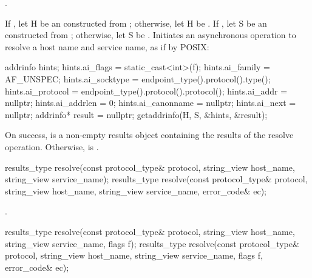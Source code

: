 \begin{itemdescr}
\pnum
\completionsig {}.

\pnum
\effects If , let H be an \ntbs constructed from ; otherwise, let H be . If , let S be an \ntbs constructed from ; otherwise, let S be . Initiates an asynchronous operation to resolve a host name and service name, as if by POSIX:
\begin{codeblock}
addrinfo hints;
hints.ai_flags = static_cast<int>(f);
hints.ai_family = AF_UNSPEC;
hints.ai_socktype = endpoint_type().protocol().type();
hints.ai_protocol = endpoint_type().protocol().protocol();
hints.ai_addr = nullptr;
hints.ai_addrlen = 0;
hints.ai_canonname = nullptr;
hints.ai_next = nullptr;
addrinfo* result = nullptr;
getaddrinfo(H, S, &hints, &result);
\end{codeblock}
 On success,  is a non-empty results object containing the results of the resolve operation. Otherwise,  is .
\end{itemdescr}

\begin{itemdecl}
results_type resolve(const protocol_type& protocol,
                     string_view host_name, string_view service_name);
results_type resolve(const protocol_type& protocol,
                     string_view host_name, string_view service_name,
                     error_code& ec);
\end{itemdecl}

\begin{itemdescr}
\pnum
\returns {}.
\end{itemdescr}

\begin{itemdecl}
results_type resolve(const protocol_type& protocol,
                     string_view host_name, string_view service_name,
                     flags f);
results_type resolve(const protocol_type& protocol,
                     string_view host_name, string_view service_name,
                     flags f, error_code& ec);
\end{itemdecl}

